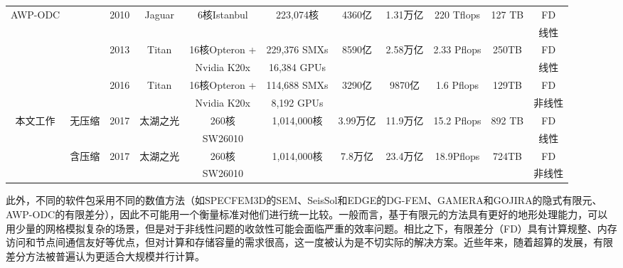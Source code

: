 \begin{landscape}
\begin{table*}[ht]
{\begin{tabular}{ccccccccccc}
\multirow{6}{*}{AWP-ODC} & \multirow{2}{*}{\citep{cui2010scalable}} & \multirow{2}{*}{2010} & \multirow{2}{*}{Jaguar} & \multirow{2}{*}{6核Istanbul} & \multirow{2}{*}{223,074核} & \multirow{2}{*}{4360亿} & \multirow{2}{*}{1.31万亿} & \multirow{2}{*}{220 Tflops} & \multirow{2}{*}{127 TB} & FD \\
 & & & & & & & & & & 线性 \\ \cline{2-11}
 & \multirow{2}{*}{\citep{cui2013physics}} & \multirow{2}{*}{2013} & \multirow{2}{*}{Titan} & 16核Opteron + & 229,376 SMXs & \multirow{2}{*}{8590亿} & \multirow{2}{*}{2.58万亿} & \multirow{2}{*}{2.33 Pflops} & \multirow{2}{*}{250TB} & FD \\
 & & & & Nvidia K20x & 16,384 GPUs & & & & & 线性 \\ \cline{2-11}
 & \multirow{2}{*}{\citep{roten2016high}} & \multirow{2}{*}{2016} & \multirow{2}{*}{Titan} & 16核Opteron + & 114,688 SMXs & \multirow{2}{*}{3290亿} & \multirow{2}{*}{9870亿} & \multirow{2}{*}{1.6 Pflops} & \multirow{2}{*}{129TB} & FD \\
 & & & & Nvidia K20x & 8,192 GPUs & & & & & 非线性 \\ \hline\hline
\multirow{4}{*}{本文工作} & \multirow{2}{*}{无压缩} & \multirow{2}{*}{2017} & \multirow{2}{*}{太湖之光} & 260核 & \multirow{2}{*}{1,014,000核} & \multirow{2}{*}{3.99万亿} & \multirow{2}{*}{11.9万亿} & \multirow{2}{*}{15.2 Pflops} & \multirow{2}{*}{892 TB} & FD \\
 & & & & SW26010 & & & & & & 线性 \\ \cline{2-11}
 & \multirow{2}{*}{含压缩} & \multirow{2}{*}{2017} & \multirow{2}{*}{太湖之光} & 260核 & \multirow{2}{*}{1,014,000核} & \multirow{2}{*}{7.8万亿} & \multirow{2}{*}{23.4万亿} & \multirow{2}{*}{18.9Pflops} & \multirow{2}{*}{724TB} & FD \\
 & & & & SW26010 & & & & & & 非线性 \\\hline\hline
\end{tabular}
}
\end{table*}
\end{landscape}


此外，不同的软件包采用不同的数值方法（如SPECFEM3D的SEM、SeisSol和EDGE的DG-FEM、GAMERA和GOJIRA的隐式有限元、AWP-ODC的有限差分），因此不可能用一个衡量标准对他们进行统一比较。一般而言，基于有限元的方法具有更好的地形处理能力，可以用少量的网格模拟复杂的场景，但是对于非线性问题的收敛性可能会面临严重的效率问题。相比之下，有限差分（FD）具有计算规整、内存访问和节点间通信友好等优点，但对计算和存储容量的需求很高，这一度被认为是不切实际的解决方案。近些年来，随着超算的发展，有限差分方法被普遍认为更适合大规模并行计算。

